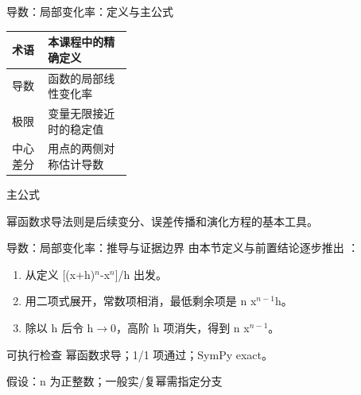 \begin{frame}[t]{导数：局部变化率：定义与主公式}
\footnotesize\begin{tabularx}{\linewidth}{p{0.30\linewidth}Y}
\toprule 术语 & 本课程中的精确定义\\\midrule
{} 导数 & 函数的局部线性变化率\\
 极限 & 变量无限接近时的稳定值\\
 中心差分 & 用点的两侧对称估计导数\\
\bottomrule\end{tabularx}\vspace{0.15cm}
\begin{block}{ 主公式}\centering{}\end{block}
幂函数求导法则是后续变分、误差传播和演化方程的基本工具。
\end{frame}

\begin{frame}[t]{导数：局部变化率：推导与证据边界}
\footnotesize
{}\quad 由本节定义与前置结论逐步推出 ：
\begin{enumerate}
\item 从定义 [(x+h)\ensuremath{^{n}}-x\ensuremath{^{n}}]/\allowbreak{}h 出发。
\item 用二项式展开，常数项相消，最低剩余项是 n x\ensuremath{^{n-1}}h。
\item 除以 h 后令 h\ensuremath{\rightarrow}0，高阶 h 项消失，得到 n x\ensuremath{^{n-1}}。
\end{enumerate}\begin{block}{可执行检查}
\quad 幂函数求导；1/1 项通过；SymPy exact。
\par\scriptsize 假设：n 为正整数；一般实/\allowbreak{}复幂需指定分支
\end{block}
\end{frame}

